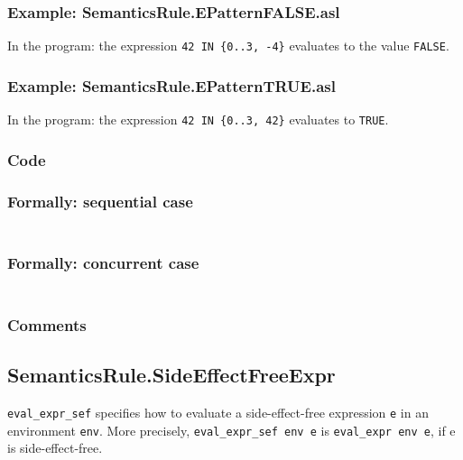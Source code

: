 \documentclass{book}
\begin{document}
  \subsubsection{Example: SemanticsRule.EPatternFALSE.asl}
    In the program:
    the expression \texttt{42 IN \{0..3, -4\}} evaluates to the value \texttt{FALSE}.

  \subsubsection{Example: SemanticsRule.EPatternTRUE.asl}
    In the program:
    the expression \texttt{42 IN \{0..3, 42\}} evaluates to \texttt{TRUE}.

  \subsubsection{Code}

  \subsubsection{Formally: sequential case}
  \begin{align}
  \end{align} 

  \subsubsection{Formally: concurrent case}
  \begin{align}
  \end{align} 

  \subsubsection{Comments}

\subsection{SemanticsRule.SideEffectFreeExpr \label{sec:SemanticsRule.SideEffectFreeExpr}}
  \texttt{eval\_expr\_sef} specifies how to evaluate a side-effect-free
expression \texttt{e} in an environment \texttt{env}. More precisely,
\texttt{eval\_expr\_sef env e} is \texttt{eval\_expr env e}, if e is
side-effect-free.
\end{document}
